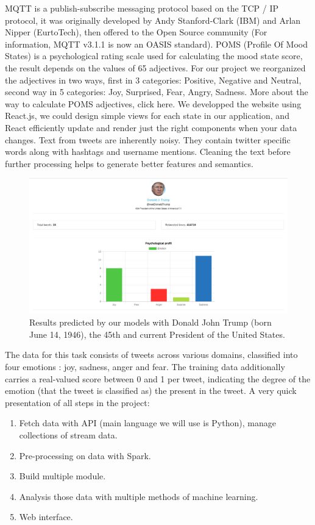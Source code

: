 \documentclass{acmtog} %
\begin{document}
MQTT is a publish-subscribe messaging protocol based on the TCP / IP protocol, it was originally developed by Andy Stanford-Clark (IBM) and Arlan Nipper (EurtoTech), then offered to the Open Source community (For information, MQTT v3.1.1 is now an OASIS standard).
POMS (Profile Of Mood States) is a psychological rating scale used for calculating the mood state score, the result depends on the values of 65 adjectives. For our project we reorganized the adjectives in two ways, first in 3 categories: Positive, Negative and Neutral, second way in 5 categories: Joy, Surprised, Fear, Angry, Sadness. More about the way to calculate POMS adjectives, click here.
We developped the website using React.js, we could design simple views for each state in our application, and React efficiently update and render just the right components when your data changes.
Text from tweets are inherently noisy. They contain twitter specific words along with hashtags and username mentions. Cleaning the text before further processing helps to generate better features and semantics.

\begin{figure}[t]
\centerline{\includegraphics[height=0.5\textwidth]{trump.png}}
\caption{Results predicted by our models with Donald John Trump (born June 14, 1946), the 45th and current President of the United States.}
  \label{fig:trump_results}
\end{figure}

The data for this task consists of tweets across various domains, classified into four emotions : joy, sadness, anger and fear. The training data additionally carries a real-valued score between 0 and 1 per tweet, indicating the degree of the emotion (that the tweet is classified as) the present in the tweet.
A very quick presentation of all steps in the project:
\begin{enumerate}
\item Fetch data with API (main language we will use is Python), manage collections of stream data.
\item Pre-processing on data with Spark.
\item Build multiple module.
\item Analysis those data with multiple methods of machine learning.
\item Web interface.
\end{enumerate}
\end{document}
